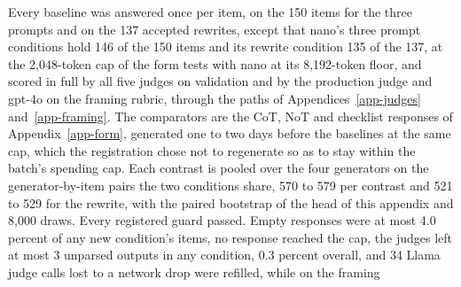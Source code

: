 Every baseline was answered once per item, on the 150 items for the three
prompts and on the 137 accepted rewrites, except that nano's three prompt
conditions hold 146 of the 150 items and its rewrite condition 135 of the
137, at the 2,048-token cap of the form tests with nano at its 8,192-token
floor, and scored in full
by all five judges on validation and by the production judge and gpt-4o on
the framing rubric, through the paths of Appendices~\ref{app-judges}
and~\ref{app-framing}.
The comparators are the CoT, NoT and checklist responses of
Appendix~\ref{app-form}, generated one to two days before the baselines at
the same cap, which the registration chose not to regenerate so as to stay
within the batch's spending cap.
Each contrast is pooled over the four generators on the generator-by-item
pairs the two conditions share, 570 to 579 per contrast and 521 to 529 for
the rewrite, with the paired bootstrap of the head of this appendix and
8,000 draws.
Every registered guard passed. Empty responses were at most 4.0 percent of
any new condition's items, no response reached the cap, the judges left at
most 3 unparsed outputs in any condition, 0.3 percent overall, and 34 Llama
judge calls lost to a network drop were refilled, while on the framing
